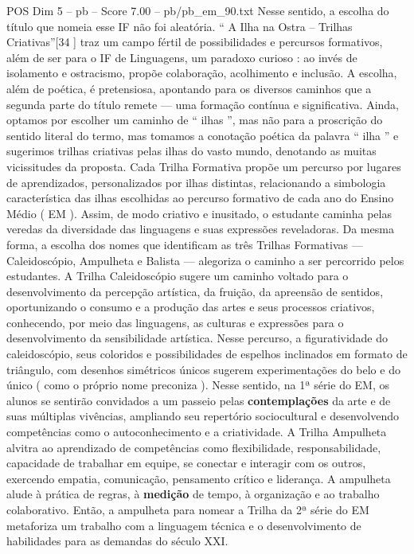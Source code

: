 \begin{textsample}{POS Dim 5 – pb – Score 7.00 – pb/pb\_em\_90.txt}
Nesse sentido, a escolha do título que nomeia esse IF não foi aleatória. “ A Ilha na Ostra – Trilhas Criativas”[34 ] traz um campo fértil de possibilidades e percursos formativos, além de ser para o IF de Linguagens, um paradoxo curioso : ao invés de isolamento e ostracismo, propõe colaboração, acolhimento e inclusão.
A escolha, além de poética, é pretensiosa, apontando para os diversos caminhos que a segunda parte do título remete — uma formação contínua e significativa.
Ainda, optamos por escolher um caminho de “ ilhas ”, mas não para a proscrição do sentido literal do termo, mas tomamos a conotação poética da palavra “ ilha ” e sugerimos trilhas criativas pelas ilhas do vasto mundo, denotando as muitas vicissitudes da proposta.
Cada Trilha Formativa propõe um percurso por lugares de aprendizados, personalizados por ilhas distintas, relacionando a simbologia característica das ilhas escolhidas ao percurso formativo de cada ano do Ensino Médio ( EM ).
Assim, de modo criativo e inusitado, o estudante caminha pelas veredas da diversidade das linguagens e suas expressões reveladoras.
Da mesma forma, a escolha dos nomes que identificam as três Trilhas Formativas — Caleidoscópio, Ampulheta e Balista — alegoriza o caminho a ser percorrido pelos estudantes.
A Trilha Caleidoscópio sugere um caminho voltado para o desenvolvimento da percepção artística, da fruição, da apreensão de sentidos, oportunizando o consumo e a produção das artes e seus processos criativos, conhecendo, por meio das linguagens, as culturas e expressões para o desenvolvimento da sensibilidade artística.
Nesse percurso, a figuratividade do caleidoscópio, seus coloridos e possibilidades de espelhos inclinados em formato de triângulo, com desenhos simétricos únicos sugerem experimentações do belo e do único ( como o próprio nome preconiza ).
Nesse sentido, na 1ª série do EM, os alunos se sentirão convidados a um passeio pelas \textbf{contemplações} da arte e de suas múltiplas vivências, ampliando seu repertório sociocultural e desenvolvendo competências como o autoconhecimento e a criatividade.
A Trilha Ampulheta alvitra ao aprendizado de competências como flexibilidade, responsabilidade, capacidade de trabalhar em equipe, se conectar e interagir com os outros, exercendo empatia, comunicação, pensamento crítico e liderança.
A ampulheta alude à prática de regras, à \textbf{medição} de tempo, à organização e ao trabalho colaborativo.
Então, a ampulheta para nomear a Trilha da 2ª série do EM metaforiza um trabalho com a linguagem técnica e o desenvolvimento de habilidades para as demandas do século XXI.

\end{textsample}
